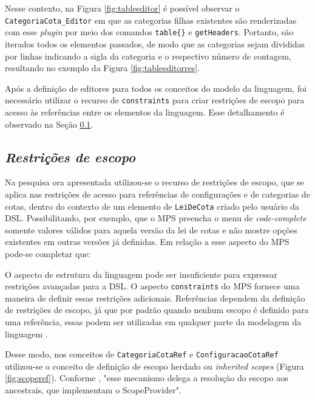Nesse contexto, na Figura \ref{fig:tableeditor} é possível observar o \texttt{CategoriaCota\_Editor} em que as categorias filhas existentes são renderizadas com esse \textit{plugin} por meio dos comandos \texttt{table\{\}} e \texttt{getHeaders}. Portanto, são iterados todos os elementos passados, de modo que as categorias sejam divididas por linhas indicando a sigla da categoria e o respectivo número de contagem, resultando no exemplo da Figura \ref{fig:tableeditorres}.





\newpage
Após a definição de editores para todos os conceitos do modelo da linguagem, foi necessário utilizar o recurso de \texttt{constraints} para criar restrições de escopo para acesso às referências entre os elementos da linguagem. Esse detalhamento é observado na Seção \ref{sub:sec:constraints}.

\subsection{\textit{Restrições de escopo}}
\label{sub:sec:constraints}

Na pesquisa ora apresentada utilizou-se o recurso de restrições de escopo, que se aplica nas restrições de acesso para referências de configurações e de categorias de cotas, dentro do contexto de um elemento de \texttt{LeiDeCota} criado pelo usuário da DSL. Possibilitando, por exemplo, que o \gls{MPS} preencha o menu de \textit{code-complete} somente valores válidos para aquela versão da lei de cotas e não mostre opções existentes em  outras versões já definidas. Em relação a esse aspecto do MPS pode-se completar que:
 
\begin{citacao}
O aspecto de estrutura da linguagem pode ser insuficiente para expressar restrições avançadas para a DSL. O aspecto \texttt{constraints} do MPS fornece uma maneira de definir essas restrições adicionais. Referências dependem da definição de restrições de escopo, já que por padrão quando nenhum escopo é definido para uma referência, essas podem ser utilizadas em qualquer parte da modelagem da linguagem \cite[s/p, tradução nossa]{jetbrains}.
\end{citacao}

Desse modo, nos conceitos de \texttt{CategoriaCotaRef} e \texttt{ConfiguracaoCotaRef} utilizou-se o conceito de definição de escopo herdado ou \textit{inherited scopes} (Figura \ref{fig:scoperef}). Conforme , "esse mecanismo delega a resolução do escopo aos ancestrais, que implementam o ScopeProvider".

